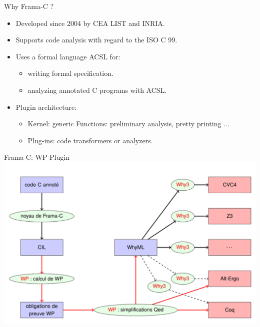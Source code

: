 \begin{frame}{Why Frama-C ?}
\begin{itemize}	
	\item Developed since 2004 by CEA LIST and INRIA.
	\item Supports code analysis with regard to the ISO C 99.
	\item Uses a formal language ACSL for:
	\begin{itemize}
		\item writing formal specification.
		\item analyzing annotated C programs with ACSL.
	\end{itemize}
    \item Plugin architecture:
    \begin{itemize}
    	\item Kernel: generic Functions: preliminary analysis, pretty printing ...
    	\item Plug-ins: code transformers or analyzers.
    \end{itemize}
\end{itemize}
\end{frame}

\begin{frame}{Frama-C: WP Plugin}
\centering \includegraphics[scale=0.50]{content/images/static-analysis/wp.PNG}
\end{frame}


